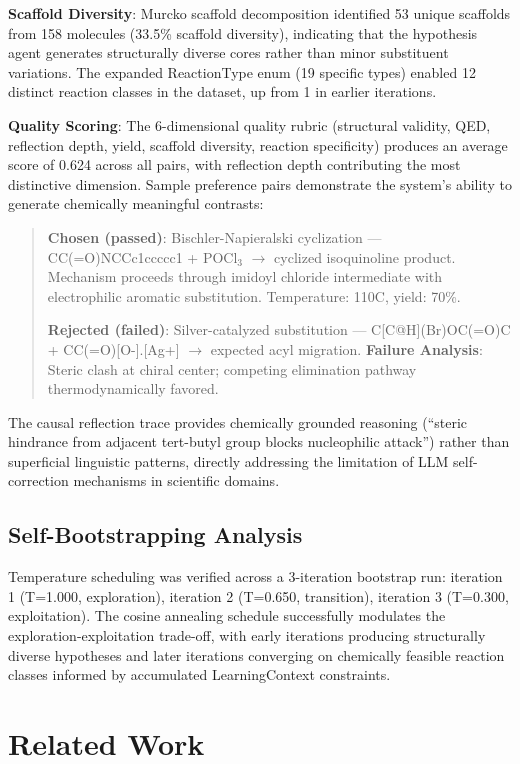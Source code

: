 \documentclass{article}
\begin{document}
\textbf{Scaffold Diversity}: Murcko scaffold decomposition identified 53 unique scaffolds from 158 molecules (33.5\% scaffold diversity), indicating that the hypothesis agent generates structurally diverse cores rather than minor substituent variations. The expanded ReactionType enum (19 specific types) enabled 12 distinct reaction classes in the dataset, up from 1 in earlier iterations.

\textbf{Quality Scoring}: The 6-dimensional quality rubric (structural validity, QED, reflection depth, yield, scaffold diversity, reaction specificity) produces an average score of 0.624 across all pairs, with reflection depth contributing the most distinctive dimension.
Sample preference pairs demonstrate the system's ability to generate chemically meaningful contrasts:

\begin{quote}
\textbf{Chosen (passed)}: Bischler-Napieralski cyclization — CC(=O)NCCc1ccccc1 + POCl$_3$ $\rightarrow$ cyclized isoquinoline product. Mechanism proceeds through imidoyl chloride intermediate with electrophilic aromatic substitution. Temperature: 110\textdegree C, yield: 70\%.

\textbf{Rejected (failed)}: Silver-catalyzed substitution — C[C@H](Br)OC(=O)C + CC(=O)[O-].[Ag+] $\rightarrow$ expected acyl migration. \textbf{Failure Analysis}: Steric clash at chiral center; competing elimination pathway thermodynamically favored.
\end{quote}

The causal reflection trace provides chemically grounded reasoning (``steric hindrance from adjacent tert-butyl group blocks nucleophilic attack'') rather than superficial linguistic patterns, directly addressing the limitation of LLM self-correction mechanisms in scientific domains.

\subsection{Self-Bootstrapping Analysis}
Temperature scheduling was verified across a 3-iteration bootstrap run: iteration 1 (T=1.000, exploration), iteration 2 (T=0.650, transition), iteration 3 (T=0.300, exploitation). The cosine annealing schedule successfully modulates the exploration-exploitation trade-off, with early iterations producing structurally diverse hypotheses and later iterations converging on chemically feasible reaction classes informed by accumulated LearningContext constraints.

\section{Related Work}
\end{document}
